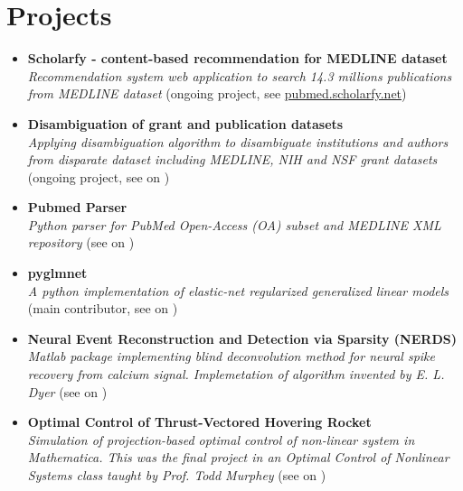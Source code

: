 \section{\sc Projects}
\begin{itemize}[leftmargin=0cm, label={}]

\item {\bf Scholarfy - content-based recommendation for MEDLINE dataset}\\
{\em Recommendation system web application to search 14.3 millions publications from MEDLINE dataset} (ongoing project, see \href{http://pubmed.scholarfy.net}{pubmed.scholarfy.net})

\item {\bf Disambiguation of grant and publication datasets}\\
{\em Applying disambiguation algorithm to disambiguate institutions and authors from disparate dataset including MEDLINE, NIH and NSF grant datasets} (ongoing project, see on \href{https://github.com/titipata/grant_database}{\faGithubAlt})

\item {\bf Pubmed Parser}\\
{\em Python parser for PubMed Open-Access (OA) subset and MEDLINE XML repository} (see on \href{https://github.com/titipata/pubmed_parser}{\faGithubAlt})

\item {\bf pyglmnet}\\
{\em A python implementation of elastic-net regularized generalized linear models} (main contributor, see on \href{https://github.com/pavanramkumar/pyglmnet}{\faGithubAlt})

\item {\bf Neural Event Reconstruction and Detection via Sparsity (NERDS)}\\
{\em Matlab package implementing blind deconvolution method for neural spike recovery from calcium signal. Implemetation of algorithm invented by E. L. Dyer} (see on \href{https://github.com/KordingLab/nerds}{\faGithubAlt})

\item {\bf Optimal Control of Thrust-Vectored Hovering Rocket}\\
{\em Simulation of projection-based optimal control of non-linear system in Mathematica. This was the final project in an  Optimal Control of Nonlinear Systems class taught by Prof. Todd Murphey} (see on \href{https://github.com/titipata/me454_nonlinear_optimal_control}{\faGithubAlt})


\end{itemize}

